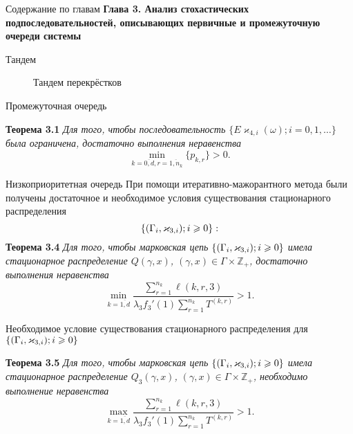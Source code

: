 \documentclass[10pt]{beamer}
\newcommand*{\hm}[1]{#1\nobreak\discretionary{}%
	{\hbox{$\mathsurround=0pt #1$}}{}}%
\newcommand{\MarkThree}{\{(\Gamma_i, \varkappa_{3,i}); \hm{} i \geqslant 0\}}
\begin{document}
  \begin{frame}{Содержание по главам}
  \Large{\textbf{Глава 3. Анализ стохастических подпоследовательностей, описывающих первичные и промежуточную очереди системы}}\par


      \end{frame}
\begin{frame}{Тандем}
        \begin{figure}[h]
    \centering
    \caption{Тандем перекрёстков}
    \label{VK:fig:1}
  \end{figure}
\end{frame}

        \begin{frame}{Промежуточная очередь}
        \begin{block}
 {\bf Теорема 3.1}
{\it 
Для того, чтобы последовательность $\{E\varkappa_{4,i}(\omega); i =0, 1, \ldots\}$ была ограничена, достаточно выполнения неравенства
\begin{equation*}
    \min_{k=\overline{0,d}, r=\overline{1,n_k}} {\{p_{k,r}\}} > 0.
\end{equation*}
}
\end{block}
      \end{frame}


        \begin{frame}[allowframebreaks]{Низкоприоритетная очередь}
При помощи итеративно-мажорантного метода были получены достаточное и необходимое условия существования стационарного распределения $$\MarkThree:$$
 {\bf Теорема 3.4}
{\it 
Для того, чтобы марковская цепь $\MarkThree$ имела стационарное распределение $Q(\gamma,x)$, $(\gamma,x)\in \Gamma \times {\mathbb Z}_+$, достаточно выполнения неравенства 
\begin{equation}
\min_{k=\overline{1,d}} { \frac{\sum_{r = 1}^{n_k} \ell(k,r,3) }{\lambda_3 f_3'(1) \sum_{r=1}^{n_k} T^{(k,r)} }}>1.
\label{sufficient:low}
\end{equation}
}
\framebreak

Необходимое условие существования стационарного распределения для $\MarkThree$ 

 {\bf Теорема 3.5}
{\it 
Для того, чтобы марковская цепь $\MarkThree$ имела стационарное распределение $Q_3(\gamma,x)$, $(\gamma,x)\in \Gamma \times {\mathbb Z}_+$, необходимо выполнение неравенства
$$
\max_{k=\overline{1,d}} { \frac{\sum_{r = 1}^{n_{k}}\ell(k,r,3)}{\lambda_3 f_3'(1) \sum_{r = 1}^{n_k} T^{(k,r)}} } >1.
$$
}

\end{frame}
\end{document}
